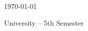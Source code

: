 \begin{titlepage}
\centering

\vspace*{2cm}


{\scshape\Large \reportsubtitle \par}
\vspace{1.5cm}

{\Huge\bfseries \reporttitle \par}
\vspace{2cm}

{\Large \reportauthors \par}
\vspace{1cm}

{\large \today \par}

\vfill

{\large University -- 5th Semester \par}

\end{titlepage}
\newpage
